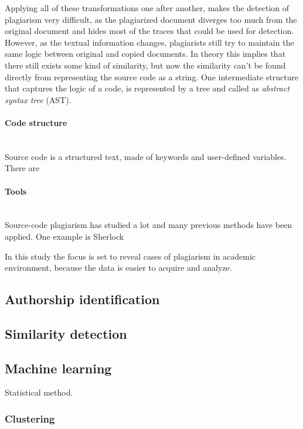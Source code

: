\noindent
Applying all of these transformations one after another, makes the detection of plagiarism very difficult, as the plagiarized document diverges too much from the original document and hides most of the traces that could be used for detection. However, as the textual information changes, plagiarists still try to maintain the same logic between original and copied documents. In theory this implies that there still exists some kind of similarity, but now the similarity can't be found directly from representing the source code as a string. One intermediate structure that captures the logic of a code, is represented by a tree and called as \emph{abstract syntax tree} (AST).

\paragraph{Code structure}\mbox{}\\
Source code is a structured text, made of keywords and user-defined variables. There are  


\newpage
\paragraph{Tools}\mbox{}\\
Source-code plagiarism has studied a lot and many previous methods have been applied. One example is Sherlock \cite{DPPA2008}

\newpage
In this study the focus is set to reveal cases of plagiarism in academic environment, because the data is easier to acquire and analyze.

\newpage


\subsection{Authorship identification}

\subsection{Similarity detection}

\subsection{Machine learning}

Statistical method.

\subsubsection{Clustering}

